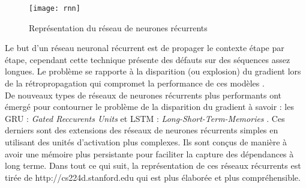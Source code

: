 \begin{figure}[h]
	\begin{center}
		\texttt{[image: rnn]}
		\caption{Représentation du réseau de neurones récurrents }
	\end{center}
\end{figure}
\smallskip
Le but d'un réseau neuronal récurrent est de propager le contexte  étape par étape, cependant cette technique présente des défauts sur des séquences assez longues. Le problème se rapporte à la disparition (ou explosion) du gradient lors de la rétropropagation qui compromet la performance de ces modèles \cite{hochreiter1998vanishing}. \\
De nouveaux types de réseaux de neurones récurrents plus performants ont émergé pour contourner  le problème de la disparition du gradient à savoir : les GRU : \textit{Gated Reccurents Units} et LSTM : \textit{Long-Short-Term-Memories} \cite{hochreiter1997long}. Ces derniers sont des extensions des réseaux de neurones récurrents simples en utilisant des unités d'activation plus complexes. Ils sont conçus de manière à avoir une mémoire plus persistante pour faciliter la capture des dépendances à long terme. Dans tout ce qui suit, la représentation de ces réseaux récurrents est tirée de http://cs224d.stanford.edu qui est plus élaborée et plus compréhensible.\\

